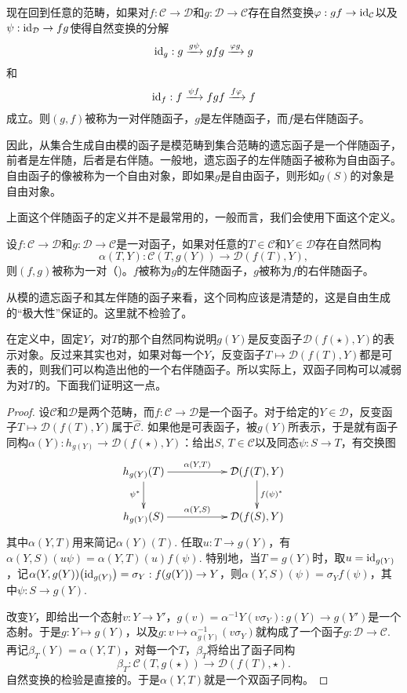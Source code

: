 \begin{para}
现在回到任意的范畴，如果对$f:\mathcal{C}\to \mathcal{D}$和$g:\mathcal{D}\to \mathcal{C}$存在自然变换$\varphi:gf\to \operatorname{id}_{\mathcal{C}}$以及$\psi:\operatorname{id}_{\mathcal{D}}\to fg$使得自然变换的分解
\[
	\operatorname{id}_g:g\xrightarrow{g \psi}gfg\xrightarrow{\varphi g}g
\]
和
\[
	\operatorname{id}_f:f\xrightarrow{\psi f}fgf\xrightarrow{f \varphi}f
\]
成立。则$(g,f)$被称为一对伴随函子，$g$是左伴随函子，而$f$是右伴随函子。
\end{para}

因此，从集合生成自由模的函子是模范畴到集合范畴的遗忘函子是一个伴随函子，前者是左伴随，后者是右伴随。一般地，遗忘函子的左伴随函子被称为自由函子。自由函子的像被称为一个自由对象，即如果$g$是自由函子，则形如$g(S)$的对象是自由对象。

上面这个伴随函子的定义并不是最常用的，一般而言，我们会使用下面这个定义。

\begin{para}
设$f:\mathcal{C}\to \mathcal{D}$和$g:\mathcal{D}\to \mathcal{C}$是一对函子，如果对任意的$T\in\mathcal{C}$和$Y\in\mathcal{D}$存在自然同构
\[
	\alpha(T,Y):\mathcal{C}(T,g(Y))\to \mathcal{D}(f(T),Y),
\]
则$(f,g)$被称为一对（)。$f$被称为$g$的左伴随函子，$g$被称为$f$的右伴随函子。
\end{para}

从模的遗忘函子和其左伴随的函子来看，这个同构应该是清楚的，这是自由生成的“极大性”保证的。这里就不检验了。

在定义中，固定$Y$，对$T$的那个自然同构说明$g(Y)$是反变函子$\mathcal{D}(f(\star),Y)$的表示对象。反过来其实也对，如果对每一个$Y$，反变函子$T\mapsto {\mathcal{D}}(f(T),Y)$都是可表的，则我们可以构造出他的一个右伴随函子。所以实际上，双函子同构可以减弱为对$T$的。下面我们证明这一点。

\begin{proof} 
	设$\mathcal{C}$和$\mathcal{D}$是两个范畴，而$f:\mathcal{C}\to \mathcal{D}$是一个函子。对于给定的$Y\in\mathcal{D}$，反变函子$T\mapsto {\mathcal{D}}(f(T),Y)$属于$\hat{\mathcal{C}}$. 如果他是可表函子，被$g(Y)$所表示，于是就有函子同构$\alpha(Y):h_{g(Y)}\to {\mathcal{D}}(f(\star),Y)$：给出$S$, $T\in \mathcal{C}$以及同态$\psi:S\to T$，有交换图
	\[
	\begin{xy}
		\xymatrix{
			h_{g(Y)}(T)\ar[rr]^-{\alpha(Y,T)} \ar[d]_{\psi^*}&&{\mathcal{D}}(f(T),Y) \ar[d]^{f(\psi)^*}\\
			h_{g(Y)}(S)\ar[rr]^-{\alpha(Y,S)}&&{\mathcal{D}}(f(S),Y)
		}
	\end{xy}
	\]
	其中$\alpha(Y,T)$用来简记$\alpha(Y)(T)$. 任取$u:T\to {g(Y)}$，有$\alpha(Y,S)(u\psi)=\alpha(Y,T)(u)f(\psi)$. 特别地，当$T=g(Y)$时，取$u=\operatorname{id}_{g(Y)}$，记$\alpha(Y,g(Y))\bigl(\operatorname{id}_{g(Y)}\bigr)=\sigma_Y:f(g(Y))\to Y$，则$\alpha(Y,S)(\psi)=\sigma_Y f(\psi)$，其中$\psi:S\to g(Y)$.

	改变$Y$，即给出一个态射$v:Y\to Y'$，$g(v)=\alpha^{-1}{Y}\left(v\sigma_Y\right):g(Y)\to g(Y')$是一个态射。于是$g:Y\mapsto g(Y)$，以及$g:v\mapsto \alpha^{-1}_{g(Y)}\left(v\sigma_Y\right)$就构成了一个函子$g:\mathcal{D}\to \mathcal{C}$. 再记$\beta_T(Y)=\alpha(Y,T)$，对每一个$T$，$\beta_T$将给出了函子同构
	\[
		\beta_T:\mathcal{C}(T,g(\star))\to \mathcal{D}(f(T),\star).
	\]
	自然变换的检验是直接的。于是$\alpha(Y,T)$就是一个双函子同构。
\end{proof}

